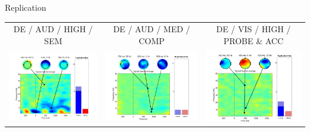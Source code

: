 \documentclass[final]{beamer}
\begin{document}
\begin{frame}{}
\begin{textblock}{63}
\begin{block}{Replication}
\begin{tabular}{c c c}
DE / AUD / HIGH / SEM & DE / AUD / MED / COMP & DE / VIS / HIGH / PROBE \& ACC \\
\includegraphics{gamma04} & \includegraphics{gamma05} & \includegraphics{gamma06} \\

\end{tabular}
\end{block}
\end{textblock}
\end{frame}
\end{document}
